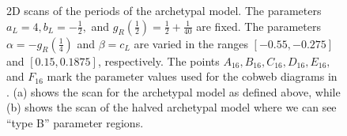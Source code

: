 \begin{figure}
	\centering
	\caption[2D scans of the periods of the archetypal model]{
		2D scans of the periods of the archetypal model.
		The parameters $a_L = 4, b_L = -\frac{1}{2},$ and $g_R\left(\frac{1}{2}\right) = \frac{1}{2} + \frac{1}{40}$ are fixed.
		The parameters $\alpha = -g_R\left(\frac{1}{4}\right)$ and $\beta = c_L$ are varied in the ranges $[-0.55, -0.275]$ and $[0.15, 0.1875]$, respectively.
		The points $A_{16}, B_{16}, C_{16}, D_{16}, E_{16},$ and $F_{16}$ mark the parameter values used for the cobweb diagrams in .
		(a) shows the scan for the archetypal model as defined above, while (b) shows the scan of the halved archetypal model where we can see ``type B'' parameter regions.
	}
	\label{fig:arch.dyn.period}
\end{figure}

